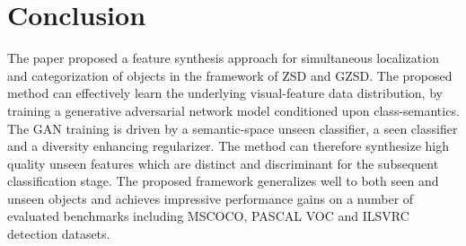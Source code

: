 \documentclass[runningheads]{llncs}
\begin{document}
\section{Conclusion}
The paper proposed a feature synthesis approach for simultaneous localization and categorization of objects in the framework of ZSD and GZSD. The proposed method can effectively learn the underlying visual-feature data distribution, by training a generative adversarial network model conditioned upon class-semantics. The GAN training is driven by a semantic-space unseen classifier, a seen classifier and a diversity enhancing regularizer. The method can therefore synthesize high quality unseen features which are distinct and discriminant for the subsequent classification stage. The proposed framework generalizes well to both seen and unseen objects and achieves impressive performance gains on a number of evaluated benchmarks including MSCOCO, PASCAL VOC and ILSVRC detection datasets. 






\end{document}
